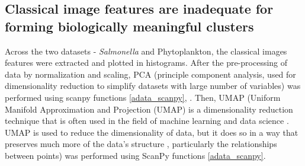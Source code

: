 \documentclass[12pt,a4paper]{article}
\begin{document}
\subsection{Classical image features are inadequate for forming biologically meaningful clusters}
Across the two datasets - \textit{Salmonella} and Phytoplankton, the classical images features were extracted and plotted in histograms. After the pre-processing of data by normalization and scaling, PCA (principle component analysis, used for dimensionality reduction to simplify datasets with large number of variables) was performed using scanpy functions \ref{adata_scanpy}, \cite{pca}. Then, UMAP (Uniform Manifold Approximation and Projection (UMAP) is a dimensionality reduction technique that is often used in the field of machine learning and data science \cite{umap}. UMAP is used to reduce the dimensionality of data, but it does so in a way that preserves much more of the data's structure \cite{umap}, particularly the relationships between points) was performed using ScanPy functions \ref{adata_scanpy}.
\end{document}
